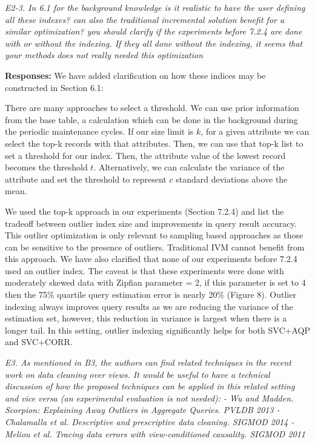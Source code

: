 \vspace{1em}
\emph{E2-3. In 6.1 for the background knowledge is it realistic to have the user defining all these indexes? can also the traditional incremental solution benefit for a similar optimization? you should clarify if the experiments before 7.2.4 are done with or without the indexing. If they all done without the indexing, it seems that your methods does not really needed this optimization}

\vspace{.25em}

{\bf Responses:} We have added clarification on how these indices may be constructed in Section 6.1:
\begin{displayquote}There are many approaches to select a threshold. We can use prior information from the base table, a calculation which can be done in the background during the periodic maintenance cycles. If our size limit is $k$, for a given attribute we can select the top-k records with that attributes. Then, we can use that top-k list to set a threshold for our index.  Then, the attribute value of the lowest record becomes the threshold $t$. Alternatively, we can calculate the variance of the attribute and set the threshold to represent $c$ standard deviations above the mean.\end{displayquote}
We used the top-k approach in our experiments (Section 7.2.4) and list the tradeoff between outlier index size and improvements in query result accuracy.
This outlier optimization is only relevant to sampling based approaches as those can be sensitive to the presence of outliers. Traditional IVM cannot benefit from this approach. 
We have also clarified that none of our experiments before 7.2.4 used an outlier index. The caveat is that these experiments were done with moderately skewed data with Zipfian parameter = 2, if this parameter is set to 4 then the 75\% quartile query estimation error is nearly 20\% (Figure 8).
Outlier indexing always improves query results as we are reducing the variance of the estimation set, however, this reduction in variance is largest when there is a longer tail.
In this setting, outlier indexing significantly helps for both SVC+AQP and SVC+CORR. 

\vspace{1em}
\emph{E3. As mentioned in B3, the authors can find related techniques in the recent work on data cleaning over views. It would be useful to have a technical discussion of how the proposed techniques can be applied in this related setting and vice versa (an experimental evaluation is not needed):
- Wu and Madden. Scorpion: Explaining Away Outliers in Aggregate Queries. PVLDB 2013
- Chalamalla et al. Descriptive and prescriptive data cleaning. SIGMOD 2014
- Meliou et al. Tracing data errors with view-conditioned causality. SIGMOD 2011}

